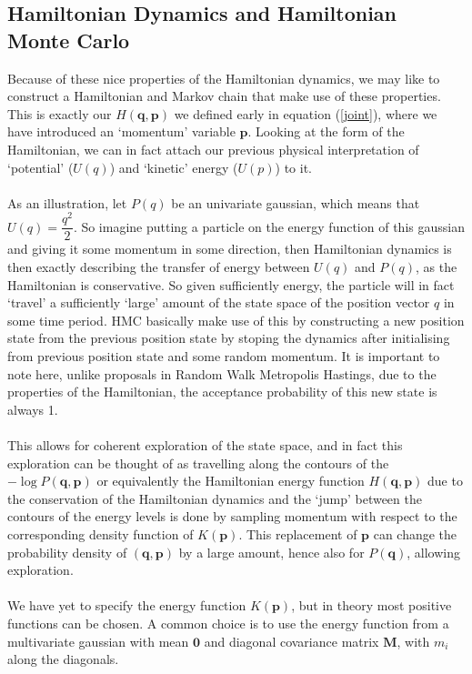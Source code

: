 \documentclass[11pt]{article}
\begin{document}
\subsection{Hamiltonian Dynamics and Hamiltonian Monte Carlo}
Because of these nice properties of the Hamiltonian dynamics, we may like to construct a Hamiltonian and Markov chain that make use of these properties. This is exactly our $H(\mathbf{q},\mathbf{p})$ we defined early in equation (\ref{joint}), where we have introduced an `momentum' variable $\mathbf{p}$. Looking at the form of the Hamiltonian, we can in fact attach our previous physical interpretation of `potential' ($U(q)$) and `kinetic' energy ($U(p)$) to it. 
\\
\\
As an illustration, let $P(q)$ be an univariate gaussian, which means that $U(q)=\dfrac{q^2}{2}$. So imagine putting a particle on the energy function of this gaussian and giving it some momentum in some direction, then Hamiltonian dynamics is then exactly describing the transfer of energy between $U(q)$ and $P(q)$, as the Hamiltonian is conservative. So given sufficiently energy, the particle will in fact `travel' a sufficiently `large' amount of the state space of the position vector $q$ in some time period. HMC basically make use of this by constructing a new position state from the previous position state by stoping the dynamics after initialising from previous position state and some random momentum. It is important to note here, unlike proposals in Random Walk Metropolis Hastings, due to the properties of the Hamiltonian, the acceptance probability of this new state is always 1. 
\\
\\
This allows for coherent exploration of the state space, and in fact this exploration can be thought of as travelling along the contours of the $-\log P(\mathbf{q},\mathbf{p})$ or equivalently the Hamiltonian energy function $H(\mathbf{q},\mathbf{p})$ due to the conservation of the Hamiltonian dynamics and the `jump' between the contours of the energy levels is done by sampling momentum with respect to the corresponding density function of $K(\mathbf{p})$. This replacement of $\mathbf{p}$ can change the probability density of $(\mathbf{q},\mathbf{p})$ by a large amount, hence also for $P(\mathbf{q})$, allowing exploration.
\\
\\
We have yet to specify the energy function $K(\mathbf{p})$, but in theory most positive functions can be chosen. A common choice is to use the energy function from a multivariate gaussian with mean $\mathbf{0}$ and diagonal covariance matrix $\mathbf{M}$, with $m_{i}$ along the diagonals.
\end{document}
